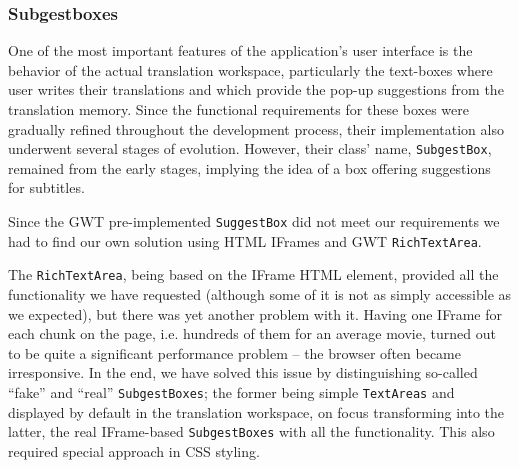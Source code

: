 {%



\subsubsection{Subgestboxes}

One of the most important features of the application's user interface is the behavior of the actual translation workspace, particularly the text-boxes where user writes their translations and which provide the pop-up suggestions from the translation memory. Since the functional requirements for these boxes were gradually refined throughout the development process, their implementation also underwent several stages of evolution. However, their class' name, {\tt SubgestBox}, remained from the early stages, implying the idea of a box offering suggestions for subtitles.

Since the GWT pre-implemented {\tt SuggestBox} did not meet our requirements we had to find our own solution using HTML IFrames and GWT {\tt RichTextArea}.

The {\tt RichTextArea}, being based on the IFrame HTML element, provided all the functionality we have requested (although some of it is not as simply accessible as we expected), but there was yet another problem with it. Having one IFrame for each chunk on the page, i.e. hundreds of them for an average movie, turned out to be quite a significant performance problem -- the browser often became irresponsive. In the end, we have solved this issue by distinguishing so-called ``fake'' and ``real'' {\tt SubgestBoxes}; the former being simple {\tt TextAreas} and displayed by default in the translation workspace, on focus transforming into the latter, the real IFrame-based {\tt SubgestBoxes} with all the functionality. This also required special approach in CSS styling.

}
